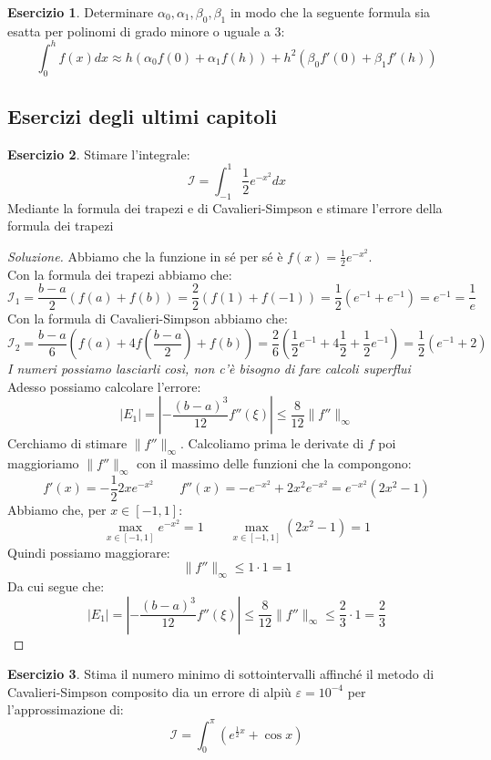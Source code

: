 \documentclass[11pt,a4paper,twoside]{article}
\newcommand{\vareps}{\varepsilon}
\theoremstyle{definition}
\newtheorem*{ese}{Esercizio}
\newenvironment{sol}
	{\renewcommand\qedsymbol{$\blacksquare$}\begin{proof}[Soluzione]}
	{\end{proof}}
\begin{document}
\begin{ese}
	Determinare $\alpha_0, \alpha_1, \beta_0, \beta_1$ in modo che la seguente formula sia esatta per polinomi di grado minore o uguale a $3$:
	\[ \int_0^h f(x)dx \approx h(\alpha_0 f(0) + \alpha_1f(h)) + h^2(\beta_0f'(0) + \beta_1f'(h))\]
\end{ese}

\subsection{Esercizi degli ultimi capitoli}

\begin{ese}
	Stimare l'integrale:
	\[ \mathcal I= \int_{-1}^1 \frac 12 e^{-x^2} dx \]
	Mediante la formula dei trapezi e di Cavalieri-Simpson e stimare l'errore della formula dei trapezi
\end{ese}

\begin{sol}
	Abbiamo che la funzione in sé per sé è $f(x) = \frac 12 e^{-x^2}$.\\
	Con la formula dei trapezi abbiamo che:
	\[ \mathcal I_1 = \frac{b-a}2 (f(a)+f(b)) = \frac 22 (f(1)+f(-1)) = \frac 12 (e^{-1} + e^{-1}) = e^{-1} = \frac 1e \]
	Con la formula di Cavalieri-Simpson abbiamo che:
	\[ \mathcal I_2 = \frac{b-a}6 \left( f(a) + 4f\left( \frac{b-a}2 \right) + f(b) \right) = \frac 26 \left( \frac 12 e^{-1} + 4 \frac 12 + \frac 12 e^{-1} \right) = \frac 12 (e^{-1} + 2)\]
	\textit{I numeri possiamo lasciarli così, non c'è bisogno di fare calcoli superflui}\\
	Adesso possiamo calcolare l'errore:
	\[ |E_1| = \left| -\frac{(b-a)^3}{12} f''(\xi) \right| \leq \frac 8{12} \|f''\|_\infty \]
	Cerchiamo di stimare $\|f''\|_\infty$. Calcoliamo prima le derivate di $f$ poi maggioriamo $\|f''\|_\infty$ con il massimo delle funzioni che la compongono:
	\[ f'(x) = -\frac 12 2x e^{-x^2}\qquad f''(x) = -e^{-x^2} + 2x^2 e^{-x^2} = e^{-x^2}(2x^2-1) \]
	Abbiamo che, per $x \in [-1,1]$:
	\[ \max_{x \in[-1,1]}e^{-x^2} = 1\qquad \max_{x \in [-1,1]}(2x^2-1) = 1 \]
	Quindi possiamo maggiorare:
	\[ \|f''\|_\infty \leq 1\cdot 1 = 1 \]
	Da cui segue che:
	\[ |E_1| = \left| -\frac{(b-a)^3}{12} f''(\xi) \right| \leq \frac 8{12} \|f''\|_\infty \leq \frac 23 \cdot 1 = \frac 23\]
\end{sol}

\begin{ese}
	Stima il numero minimo di sottointervalli affinché il metodo di Cavalieri-Simpson composito dia un errore di alpiù $\vareps=10^{-4}$ per l'approssimazione di:
	\[ \mathcal I = \int_0^\pi \left( e^{\frac 12 x} + \cos x \right) \]
\end{ese}
\end{document}
